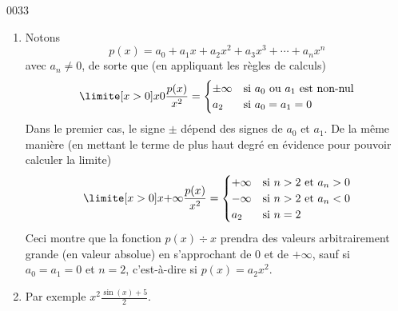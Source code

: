 
\begin{corrige}{0033}

\begin{enumerate}
\item Notons
  \begin{equation*}
    p(x) = a_0 + a_1 x + a_2 x^2 + a_3 x^3 + \cdots + a_n x^n
  \end{equation*}
  avec $a_n \neq 0$, de sorte que (en appliquant les règles de
  calculs)
  \begin{equation*}
    \limite[x > 0] x 0 \frac{p(x)}{x^2} =
    \begin{cases}
      \pm\infty & \text{si $a_0$ ou $a_1$ est non-nul}\\
      a_2 & \text{si $a_0 = a_1 = 0$}
    \end{cases}
  \end{equation*}
	Dans le premier cas, le signe $\pm$ dépend des signes de $a_0$ et $a_1$.
  De la même manière (en mettant le terme de plus haut degré en
  évidence pour pouvoir calculer la limite)
  \begin{equation*}
    \limite[x > 0] x {+\infty} \frac{p(x)}{x^2} =
    \begin{cases}
      +\infty & \text{si $n > 2$ et $a_n > 0$}\\
      -\infty & \text{si $n > 2$ et $a_n < 0$}\\
      a_2 & \text{si $n = 2$}
    \end{cases}
  \end{equation*}
  Ceci montre que la fonction $p(x) \div x$ prendra des valeurs
  arbitrairement grande (en valeur absolue) en s'approchant de $0$ et
  de $+\infty$, sauf si $a_0 = a_1 = 0$ et $n = 2$, c'est-à-dire si
  $p(x) = a_2 x^2$.

\item Par exemple $x^2 {\frac{\sin(x)+ 5}{2}}$.
\end{enumerate}

\end{corrige}
